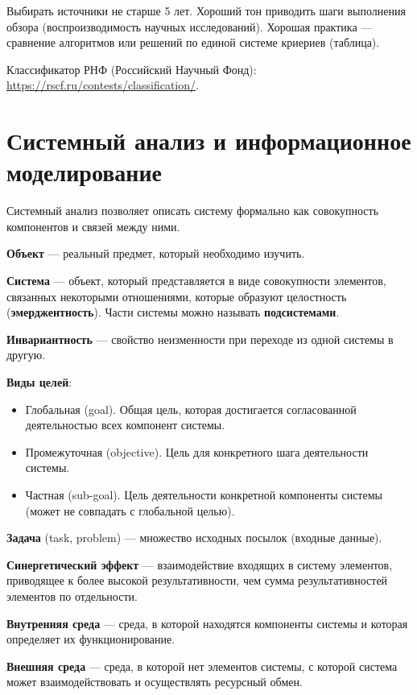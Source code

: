 Выбирать источники не старше 5 лет. Хороший тон приводить шаги выполнения
обзора (воспроизводимость научных исследований). Хорошая практика --- сравнение
алгоритмов или решений по единой системе криериев (таблица).

Классификатор РНФ (Российский Научный Фонд):
\url{https://rscf.ru/contests/classification/}.

\section{Системный анализ и информационное моделирование}

Системный анализ позволяет описать систему формально как совокупность
компонентов и связей между ними.

\textbf{Объект} --- реальный предмет, который необходимо изучить.

\textbf{Система} --- объект, который представляется в виде совокупности
элементов, связанных некоторыми отношениями, которые образуют целостность
(\textbf{эмерджентность}). Части системы можно называть \textbf{подсистемами}.

\textbf{Инвариантность} --- свойство неизменности при переходе из одной системы
в другую.

\textbf{Виды целей}:
\begin{itemize}
    \item Глобальная (goal). Общая цель, которая достигается
        согласованной деятельностью всех компонент системы.

    \item Промежуточная (objective). Цель для конкретного шага деятельности
        системы.

    \item Частная (sub-goal). Цель деятельности конкретной компоненты системы
        (может не совпадать с глобальной целью).
\end{itemize}

\textbf{Задача} (task, problem) --- множество исходных посылок (входные данные).

\textbf{Синергетический эффект} --- взаимодействие входящих в систему элементов,
приводящее к более высокой результативности, чем сумма результативностей
элементов по отдельности.

\textbf{Внутренняя среда} --- среда, в которой находятся компоненты системы и которая
определяет их функционирование.

\textbf{Внешняя среда} --- среда, в которой нет элементов системы, с которой система
может взаимодействовать и осуществлять ресурсный обмен.

